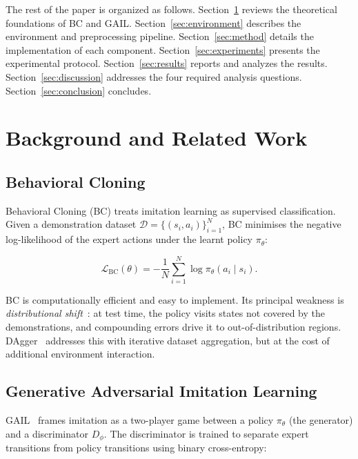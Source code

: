 \documentclass[conference]{IEEEtran}
\begin{document}
The rest of the paper is organized as follows.
Section~\ref{sec:background} reviews the theoretical foundations of BC and GAIL.
Section~\ref{sec:environment} describes the environment and preprocessing pipeline.
Section~\ref{sec:method} details the implementation of each component.
Section~\ref{sec:experiments} presents the experimental protocol.
Section~\ref{sec:results} reports and analyzes the results.
Section~\ref{sec:discussion} addresses the four required analysis questions.
Section~\ref{sec:conclusion} concludes.

\section{Background and Related Work}
\label{sec:background}

\subsection{Behavioral Cloning}

Behavioral Cloning (BC) treats imitation learning as supervised classification.
Given a demonstration dataset $\mathcal{D} = \{(s_i, a_i)\}_{i=1}^{N}$, BC minimises the
negative log-likelihood of the expert actions under the learnt policy $\pi_\theta$:

\begin{equation}
  \mathcal{L}_{\text{BC}}(\theta) = -\frac{1}{N} \sum_{i=1}^{N} \log \pi_\theta(a_i \mid s_i).
  \label{eq:bc}
\end{equation}

BC is computationally efficient and easy to implement.
Its principal weakness is \emph{distributional shift}~\cite{ross2011dagger}: at test time,
the policy visits states not covered by the demonstrations, and compounding errors drive it
to out-of-distribution regions.
DAgger~\cite{ross2011dagger} addresses this with iterative dataset aggregation, but at the
cost of additional environment interaction.

\subsection{Generative Adversarial Imitation Learning}

GAIL~\cite{ho2016gail} frames imitation as a two-player game between a policy $\pi_\theta$
(the generator) and a discriminator $D_\phi$.
The discriminator is trained to separate expert transitions from policy transitions using
binary cross-entropy:
\end{document}
